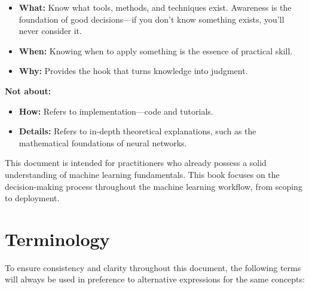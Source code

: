 \documentclass[12pt,openany, draft]{book}
\begin{document}
\begin{itemize}
    \item \textcolor{green!50!black}{\textbf{What:}} Know what tools, methods, and techniques exist. Awareness is the foundation of good decisions—if you don’t know something exists, you’ll never consider it.
    \item \textcolor{green!50!black}{\textbf{When:}} Knowing when to apply something is the essence of practical skill.
    \item \textcolor{green!50!black}{\textbf{Why:}} Provides the hook that turns knowledge into judgment.
\end{itemize}

\vspace{1em}
\textbf{Not about:}

\begin{itemize}
    \item \textcolor{red!70!black}{\textbf{How:}} Refers to implementation—code and tutorials.
    \item \textcolor{red!70!black}{\textbf{Details:}} Refers to in-depth theoretical explanations, such as the mathematical foundations of neural networks.
\end{itemize}


This document is intended for practitioners who already possess a 
solid understanding of machine learning fundamentals. This book focuses on the decision-making process throughout the machine learning workflow, from scoping to deployment.



\section{Terminology}

To ensure consistency and clarity throughout this document, the following terms will always be used in preference to alternative expressions for the same concepts:
\end{document}
